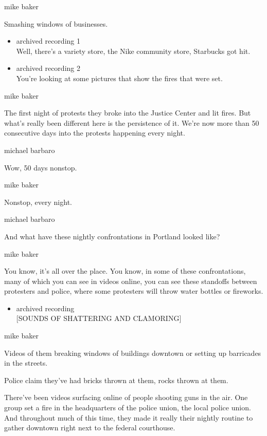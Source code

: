 mike baker

Smashing windows of businesses.

\begin{itemize}
\item
  archived recording 1\\
  Well, there's a variety store, the Nike community store, Starbucks got
  hit.
\item
  archived recording 2\\
  You're looking at some pictures that show the fires that were set.
\end{itemize}

mike baker

The first night of protests they broke into the Justice Center and lit
fires. But what's really been different here is the persistence of it.
We're now more than 50 consecutive days into the protests happening
every night.

michael barbaro

Wow, 50 days nonstop.

mike baker

Nonstop, every night.

michael barbaro

And what have these nightly confrontations in Portland looked like?

mike baker

You know, it's all over the place. You know, in some of these
confrontations, many of which you can see in videos online, you can see
these standoffs between protesters and police, where some protesters
will throw water bottles or fireworks.

\begin{itemize}
\tightlist
\item
  archived recording\\
  {[}SOUNDS OF SHATTERING AND CLAMORING{]}
\end{itemize}

mike baker

Videos of them breaking windows of buildings downtown or setting up
barricades in the streets.

Police claim they've had bricks thrown at them, rocks thrown at them.

There've been videos surfacing online of people shooting guns in the
air. One group set a fire in the headquarters of the police union, the
local police union. And throughout much of this time, they made it
really their nightly routine to gather downtown right next to the
federal courthouse.

